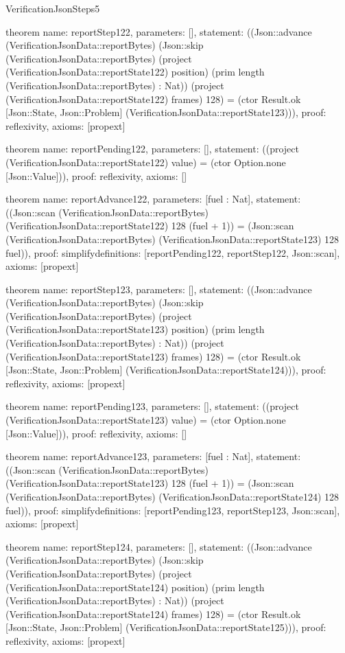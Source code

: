 \begin{lexlean}{VerificationJsonSteps5}
\begin{semanticmodule}
theorem{
  name: reportStep122,
  parameters: [],
  statement: ((Json::advance (VerificationJsonData::reportBytes) (Json::skip (VerificationJsonData::reportBytes) (project (VerificationJsonData::reportState122) position) (prim length (VerificationJsonData::reportBytes) : Nat)) (project (VerificationJsonData::reportState122) frames) 128) = (ctor Result.ok [Json::State, Json::Problem] (VerificationJsonData::reportState123))),
  proof: reflexivity{},
  axioms: [propext]
}

theorem{
  name: reportPending122,
  parameters: [],
  statement: ((project (VerificationJsonData::reportState122) value) = (ctor Option.none [Json::Value])),
  proof: reflexivity{},
  axioms: []
}

theorem{
  name: reportAdvance122,
  parameters: [fuel : Nat],
  statement: ((Json::scan (VerificationJsonData::reportBytes) (VerificationJsonData::reportState122) 128 (fuel + 1)) = (Json::scan (VerificationJsonData::reportBytes) (VerificationJsonData::reportState123) 128 fuel)),
  proof: simplify{definitions: [reportPending122, reportStep122, Json::scan]},
  axioms: [propext]
}

theorem{
  name: reportStep123,
  parameters: [],
  statement: ((Json::advance (VerificationJsonData::reportBytes) (Json::skip (VerificationJsonData::reportBytes) (project (VerificationJsonData::reportState123) position) (prim length (VerificationJsonData::reportBytes) : Nat)) (project (VerificationJsonData::reportState123) frames) 128) = (ctor Result.ok [Json::State, Json::Problem] (VerificationJsonData::reportState124))),
  proof: reflexivity{},
  axioms: [propext]
}

theorem{
  name: reportPending123,
  parameters: [],
  statement: ((project (VerificationJsonData::reportState123) value) = (ctor Option.none [Json::Value])),
  proof: reflexivity{},
  axioms: []
}

theorem{
  name: reportAdvance123,
  parameters: [fuel : Nat],
  statement: ((Json::scan (VerificationJsonData::reportBytes) (VerificationJsonData::reportState123) 128 (fuel + 1)) = (Json::scan (VerificationJsonData::reportBytes) (VerificationJsonData::reportState124) 128 fuel)),
  proof: simplify{definitions: [reportPending123, reportStep123, Json::scan]},
  axioms: [propext]
}

theorem{
  name: reportStep124,
  parameters: [],
  statement: ((Json::advance (VerificationJsonData::reportBytes) (Json::skip (VerificationJsonData::reportBytes) (project (VerificationJsonData::reportState124) position) (prim length (VerificationJsonData::reportBytes) : Nat)) (project (VerificationJsonData::reportState124) frames) 128) = (ctor Result.ok [Json::State, Json::Problem] (VerificationJsonData::reportState125))),
  proof: reflexivity{},
  axioms: [propext]
}


\end{semanticmodule}
\end{lexlean}
